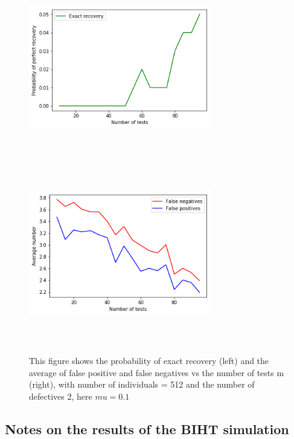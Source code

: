 \begin{figure}[H]\label{mu}
	\includegraphics[height=8cm, width=8cm]{images/exa_mu}
	\includegraphics[height=8cm, width=8cm]{images/fal_mu}
	\caption{This figure shows the probability of exact recovery (left) and  the average of false positive and false negatives vs the number of tests m (right), with number of individuals  = 512 and the number of defectives 2, here $ mu = 0.1 $}
\end{figure}


\subsection{Notes on the results of the BIHT simulation} 


